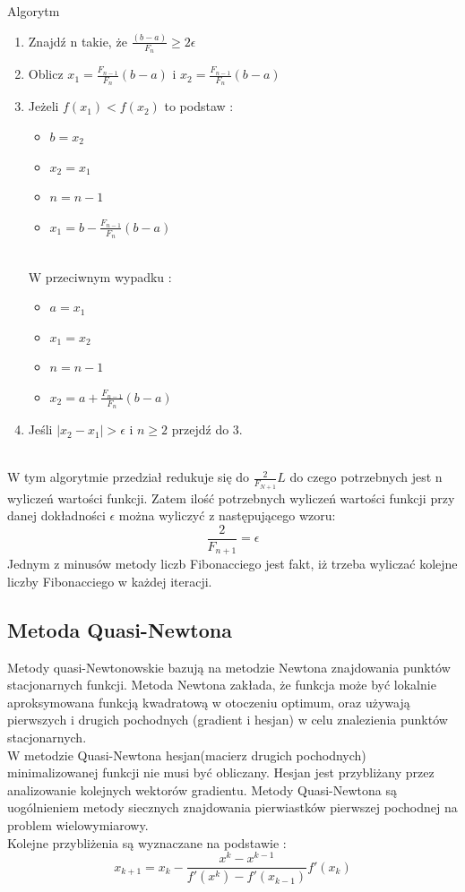 \documentclass{classrep}
\begin{document}
Algorytm\\
\begin{enumerate}
\item Znajdź n takie, że $\frac{(b-a)}{F_n}\geq 2\epsilon$
\item Oblicz $x_1 = \frac{F_{n-1}}{F_n}(b-a)$ i $x_2 = \frac{F_{n-1}}{F_n}(b-a)$
\item  Jeżeli $f(x_1)<f(x_2)$ to podstaw :
	\begin{itemize}
	\item $b=x_2$
	\item $x_2=x_1$
	\item $n=n-1$
	\item $x_1 = b - \frac{F_{n-1}}{F_n}(b-a)$
	\end{itemize}
	\\
	W przeciwnym wypadku :
	\begin{itemize}
	\item $a=x_1$
	\item $x_1=x_2$
	\item $n=n-1$
	\item $x_2 = a + \frac{F_{n-1}}{F_n}(b-a)$
	\end{itemize}	
	\item Jeśli $|x_2-x_1|>\epsilon$ i $n \geq 2$ przejdź do 3.
\end{enumerate}
\\

W tym algorytmie przedział redukuje się do $\frac{2}{F_{N+1}} L$ do czego potrzebnych jest n wyliczeń wartości funkcji. Zatem ilość potrzebnych wyliczeń wartości funkcji przy danej dokładności $\epsilon$ można wyliczyć z następującego wzoru:\\
$$\frac{2}{F_{n+1}} = \epsilon$$
Jednym z minusów metody liczb Fibonacciego jest fakt, iż trzeba wyliczać kolejne liczby Fibonacciego w każdej iteracji.

\subsection{Metoda Quasi-Newtona}
Metody quasi-Newtonowskie bazują na metodzie Newtona znajdowania punktów stacjonarnych funkcji. Metoda Newtona zakłada, że funkcja może być lokalnie aproksymowana funkcją kwadratową w otoczeniu optimum, oraz używają pierwszych i drugich pochodnych (gradient i hesjan) w celu znalezienia punktów stacjonarnych.\\
W metodzie Quasi-Newtona hesjan(macierz drugich pochodnych) minimalizowanej funkcji nie musi być obliczany. Hesjan jest przybliżany przez analizowanie kolejnych wektorów gradientu. Metody Quasi-Newtona są uogólnieniem metody siecznych znajdowania pierwiastków pierwszej pochodnej na problem wielowymiarowy.\\
Kolejne przybliżenia są wyznaczane na podstawie :\\
\begin{equation}
x_{k+1} = x_k - \frac{x^k-x^{k-1}}{f'(x^k)-f'(x_{k-1})} f'(x_k)
\end{equation}
\end{document}
